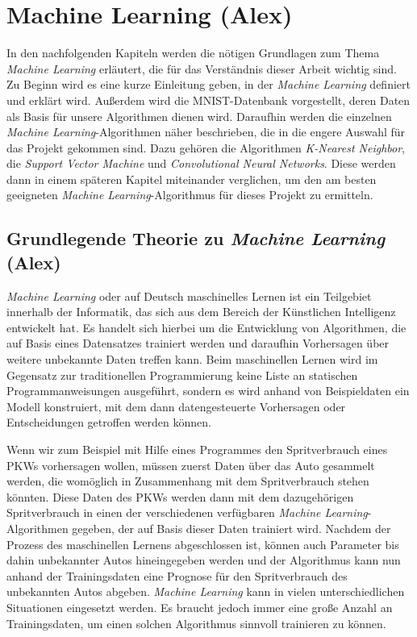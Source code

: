 \section{Machine Learning (Alex)} \label{sec:machinelearning}
In den nachfolgenden Kapiteln werden die nötigen Grundlagen zum Thema \textit{Machine Learning} erläutert, die für das Verständnis dieser Arbeit wichtig sind.
Zu Beginn wird es eine kurze Einleitung geben, in der \textit{Machine Learning} definiert und erklärt wird. Außerdem wird die MNIST-Datenbank vorgestellt, deren
Daten als Basis für unsere Algorithmen dienen wird. Daraufhin werden die einzelnen \textit{Machine Learning}-Algorithmen näher beschrieben, die in die engere
Auswahl für das Projekt gekommen sind. Dazu gehören die Algorithmen \textit{K-Nearest Neighbor}, die \textit{Support Vector Machine} und \textit{Convolutional
Neural Networks}. Diese werden dann in einem späteren Kapitel miteinander verglichen, um den am besten geeigneten \textit{Machine Learning}-Algorithmus 
für dieses Projekt zu ermitteln.

\subsection{Grundlegende Theorie zu \textit{Machine Learning} (Alex)}
\textit{Machine Learning} oder auf Deutsch maschinelles Lernen ist ein Teilgebiet innerhalb der Informatik, das sich aus dem Bereich der Künstlichen Intelligenz
entwickelt hat. Es handelt sich hierbei um die Entwicklung von Algorithmen, die auf Basis eines Datensatzes trainiert werden und daraufhin Vorhersagen über
weitere unbekannte Daten treffen kann. Beim maschinellen Lernen wird im Gegensatz zur traditionellen Programmierung keine Liste an statischen Programmanweisungen
ausgeführt, sondern es wird anhand von Beispieldaten ein Modell konstruiert, mit dem dann datengesteuerte Vorhersagen oder Entscheidungen getroffen werden
können.\cite{simon_2015}

Wenn wir zum Beispiel mit Hilfe eines Programmes den Spritverbrauch eines PKWs vorhersagen wollen, müssen zuerst Daten über das Auto gesammelt werden, die womöglich
in Zusammenhang mit dem Spritverbrauch stehen könnten. Diese Daten des PKWs werden dann mit dem dazugehörigen Spritverbrauch in einen der verschiedenen verfügbaren 
\textit{Machine Learning}-Algorithmen gegeben, der auf Basis dieser Daten trainiert wird. 
Nachdem der Prozess des maschinellen Lernens abgeschlossen ist, können auch Parameter bis dahin unbekannter Autos hineingegeben werden und der Algorithmus kann nun
anhand der Trainingsdaten eine Prognose für den Spritverbrauch des unbekannten Autos abgeben.
\textit{Machine Learning} kann in vielen unterschiedlichen Situationen eingesetzt werden. Es braucht jedoch immer eine große Anzahl an Trainingsdaten, um einen
solchen Algorithmus sinnvoll trainieren zu können.

